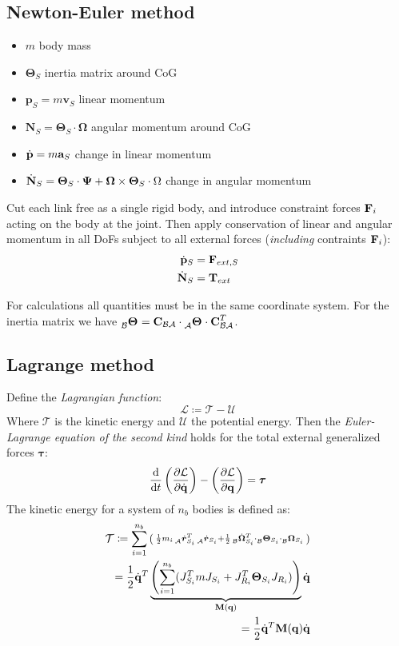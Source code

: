 \documentclass[a4paper, 8pt]{extarticle}
\newcommand{\mvec}[3]{  \prescript{}{\mathcal{#1}}{\bm{#2}}  _{#3} }
\newcommand{\mdvec}[3]{ \prescript{}{\mathcal{#1}}{\dot{\bm #2}} _{#3} }
\newcommand{\mrot}[2]{ \textbf{#1}_{ \mathcal{#2} } }
\begin{document}
\begin{multicols*}{3}
\subsection*{Newton-Euler method}
\begin{itemize}
\item $m$ body mass
\item $\bm\Theta_S$ inertia matrix around CoG
\item $\mathbf p_S = m \mathbf v_S$ linear momentum
\item $\mathbf N_S = \bm\Theta_S\cdot \bm\Omega$ angular momentum around CoG
\item $\dot{\bf p} = m {\bf a}_S$ change in linear momentum
\item $\dot{\bf N}_S = \bm\Theta_S \cdot \bm\Psi + \bm\Omega \times \bm\Theta_S \cdot \Omega$ change in angular momentum
\end{itemize}
\vspace{0.5em}
\noindent Cut each link free as a single rigid body, and introduce constraint forces ${\bf F}_i$ acting on the body at the joint. Then apply conservation of linear and angular momentum in all DoFs subject to all external forces (\textit{including} contraints ${\bf F}_i$):
\begin{align*}
\dot{\bf p}_S &= {\bf F}_{ext,S}\\
\dot{\bf N}_S &= {\bf T}_{ext}
\end{align*}

For calculations all quantities must be in the same coordinate system. For the inertia matrix we have $\mvec{B}{\Theta}{} = \mrot{C}{BA} \cdot \mvec{A}{\Theta}{} \cdot \mrot{C}{BA}^T$.



\subsection*{Lagrange method}
Define the \emph{Lagrangian function}:
$$\mathcal L \coloneqq \mathcal T - \mathcal U$$
Where $\mathcal T$ is the kinetic energy and $\mathcal U$ the potential energy. Then the \emph{Euler-Lagrange equation of the second kind} holds for the total external generalized forces $\bm\tau$:
$$\frac{\text d}{\text dt} \left( \frac{\partial\mathcal L}{\partial \dot{\bf q}} \right) - \left( \frac{\partial\mathcal L}{\partial \bf q} \right) = \bm\tau$$
The kinetic energy for a system of $n_b$ bodies is defined as:
\begin{align*}
\mathcal T \coloneqq \sum_{i=1}^{n_b}\left(\begin{smallmatrix} \frac 12 m_i \mdvec{A}{r}{S_i}^T \mdvec{A}{r}{S_i} + \frac 12 \mdvec{B}{\Omega}{S_i}^T \cdot \mvec{B}{\Theta}{S_i} \cdot \mvec{B}{\Omega}{S_i} \end{smallmatrix} \right) \\
= \frac 12 \dot{\bf q}^T \underbrace{ \left(  \sum_{i=1}^{n_b} (J^T_{S_i}mJ_{S_i} + J^T_{R_i} \bm\Theta_{S_i} J_{R_i})  \right) }_{\bf M(q)} \dot{\bf q} \\
= \frac 12 \dot{\bf q}^T {\bf M(q)} \dot{\bf q}
\end{align*}


\end{multicols*}
\end{document}
